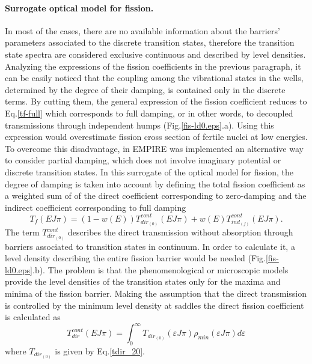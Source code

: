 \documentclass[twocolumn,amsmath,amssymb,10pt,groupedaddress,letter]{revtex4}
\begin{document}
\paragraph*{Surrogate optical model for fission.}
In most of the cases, there are no available information about the barriers' parameters
associated to the discrete transition states, therefore the transition state spectra are
considered exclusive continuous and described by level densities. Analyzing the expressions
of the fission coefficients in the previous paragraph, it can be easily noticed that the
coupling among the vibrational states in the wells, determined by the degree of their damping,
is contained only in the discrete terms. By cutting them, the general expression of the fission
coefficient reduces to Eq.\ref{tf-full} which corresponds to full damping, or in other words,
 to decoupled
transmissions through independent humps (Fig.\ref{fis-ld0.eps}.a). Using this expression would overestimate fission cross
section of fertile nuclei at low energies. To overcome this disadvantage, in EMPIRE was
implemented an alternative way to consider partial damping, which does not involve imaginary
potential or discrete transition states.
In this surrogate of the optical model for fission, the degree of
damping is taken into account by defining the total fission coefficient as a weighted sum of
of the direct coefficient corresponding to zero-damping and the indirect coefficient
corresponding to full damping
%
\begin{equation}
T_{f}(E J \pi)=(1-w(E))T_{dir_{(0)}}^{cont}(E J \pi)+w(E)T_{ind_{(f)}}^{cont}(E J \pi).
\label{tfsurr}
\end{equation}
%
The term $T_{dir_{(0)}}^{cont}$ describes the direct transmission without absorption through
barriers associated to transition states in continuum. In order to calculate it, a level
density describing the entire fission barrier would be needed (Fig.\ref{fis-ld0.eps}.b).
The problem is that the phenomenological
or microscopic models provide the level densities of the transition states only for the
maxima and minima of the fission barrier. Making the assumption that the direct transmission
is controlled by the minimum level density at saddles the direct fission coefficient is
calculated as
%
\begin{equation}
T_{dir}^{cont}(EJ\pi)=\int_0^{\infty}T_{dir_{(0)}}(\varepsilon J \pi)\rho_{min} (\varepsilon J \pi)
d \varepsilon
\end{equation}
where $T_{dir_{(0)}}$ is given by Eq.\ref{tdir_20}.
\end{document}
